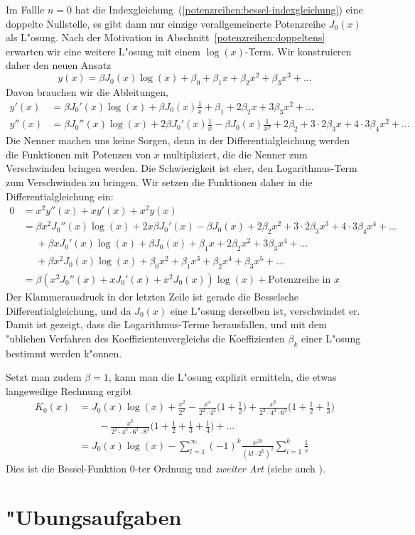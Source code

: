 Im Fallle $n=0$ hat die
Indexgleichung~(\ref{potenzreihen:bessel-indexgleichung}) eine doppelte
Nullstelle, es gibt dann nur einzige verallgemeinerte Potenzreihe
$J_0(x)$ als L"osung.
Nach der Motivation in Abschnitt~\ref{potenzreihen:doppeltens} erwarten
wir eine weitere L"osung mit einem $\log(x)$-Term.
Wir konstruieren daher den neuen Ansatz
\begin{equation}
y(x)
=
\beta J_0(x)\log(x)+\beta_0+\beta_1x+\beta_2x^2+\beta_3x^3+\dots
\label{potenzreihen:k0ansatz}
\end{equation}
Davon brauchen wir die Ableitungen, 
\begin{align*}
y'(x)
&=
\beta J_0'(x)\log(x) + \beta J_0(x)\frac1x+\beta_1+2\beta_2x+3\beta_3x^2+\dots
\\
y''(x)
&=
\beta J_0''(x)\log(x) + 2\beta J_0'(x)\frac1x-\beta J_0(x)\frac1{x^2} + 2\beta_2 + 3\cdot 2\beta_3 x + 4\cdot 3\beta_4 x^2+\dots
\end{align*}
Die Nenner machen uns keine Sorgen, denn in der Differentialgleichung werden
die Funktionen mit Potenzen von $x$ multipliziert, die die Nenner zum
Verschwinden bringen werden.
Die Schwierigkeit ist eher, den Logarithmus-Term zum Verschwinden zu bringen.
Wir setzen die Funktionen daher in die Differentialgleichung ein:
\begin{align*}
0
&=
x^2y''(x)+xy'(x)+x^2y(x)
\\
&=
\beta x^2J_0''(x)\log(x) + 2x\beta J_0'(x)-\beta J_0(x) + 2\beta_2x^2 + 3\cdot 2\beta_3 x^3 + 4\cdot 3\beta_4 x^4+\dots
\\
&\phantom{=}+
\beta xJ_0'(x)\log(x) + \beta J_0(x)+\beta_1x+2\beta_2x^2+3\beta_3x^4+\dots
\\
&\phantom{=}+
\beta x^2J_0(x)\log(x)+\beta_0x^2+\beta_1x^3 +\beta_2x^4+\beta_3x^5+\dots
\\
&=
\beta(x^2J_0''(x)+xJ_0'(x)+x^2J_0(x))\log(x)
+
\text{Potenzreihe in $x$}
\end{align*}
Der Klammerausdruck in der letzten Zeile ist gerade die Besselsche
Differentialgleichung, und da $J_0(x)$ eine L"osung derselben ist,
verschwindet er.
Damit ist gezeigt, dass die Logarithmus-Terme herausfallen, und mit dem
"ublichen Verfahren des Koeffizientenvergleichs die Koeffizienten
$\beta_k$ einer L"osung bestimmt werden k"onnen.

Setzt man zudem $\beta=1$, kann man die L"osung explizit ermitteln, die
etwas langeweilige Rechnung ergibt
\begin{align*}
K_0(x)
&=
J_0(x)\log(x)
+
\frac{x^2}{2^2}
-
\frac{x^4}{2^2\cdot 4^2}\biggl(1+\frac12\biggr)
+
\frac{x^6}{2^2\cdot 4^2\cdot 6^2}\biggl(1+\frac12+\frac13\biggr)
\\
&\qquad
-
\frac{x^8}{2^2\cdot 4^2\cdot 6^2\cdot 8^2}\biggl(1+\frac12+\frac13+\frac14\biggr)
+
\dots
\label{potenzreihen:k0}
\\
&=
J_0(x)\log(x)
-\sum_{l=1}^\infty (-1)^k\frac{x^{2k}}{(k!\cdot 2^k)^2}\sum_{i=1}^k\frac1s
\end{align*}
Dies ist die Bessel-Funktion 0-ter Ordnung und {\em zweiter Art} (siehe auch
\cite{skript:smirnow2}).

\section{"Ubungsaufgaben}




